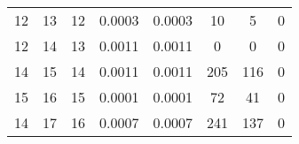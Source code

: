 \begin{table}[]
\begin{tabular}{@{}cccccccc@{}}
12                                                        & 13                                                          & 12                                                   & 0.0003                                                                           & 0.0003                                                                          & 10                                                                              & 5                                                                                    & 0                                                                          \\
12                                                        & 14                                                          & 13                                                   & 0.0011                                                                           & 0.0011                                                                          & 0                                                                               & 0                                                                                    & 0                                                                          \\
14                                                        & 15                                                          & 14                                                   & 0.0011                                                                           & 0.0011                                                                          & 205                                                                             & 116                                                                                  & 0                                                                          \\
15                                                        & 16                                                          & 15                                                   & 0.0001                                                                           & 0.0001                                                                          & 72                                                                              & 41                                                                                   & 0                                                                          \\
14                                                        & 17                                                          & 16                                                   & 0.0007                                                                           & 0.0007                                                                          & 241                                                                             & 137                                                                                  & 0                                                                          \\ \bottomrule
\end{tabular}
\end{table}

